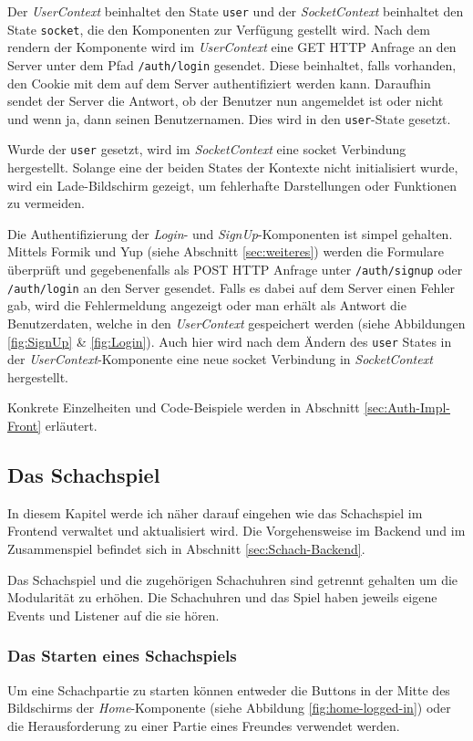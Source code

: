 Der \textit{UserContext} beinhaltet den State \verb|user| und der \textit{SocketContext} beinhaltet den State \verb|socket|, die den Komponenten zur Verfügung gestellt wird.
Nach dem rendern der Komponente wird im \textit{UserContext} eine GET HTTP Anfrage an den Server unter dem Pfad \verb|/auth/login| gesendet. Diese beinhaltet, falls vorhanden, den Cookie mit dem auf dem Server authentifiziert werden kann. Daraufhin sendet der Server die Antwort, ob der Benutzer nun angemeldet ist oder nicht und wenn ja, dann seinen Benutzernamen.
Dies wird in den \verb|user|-State gesetzt.

Wurde der \verb|user| gesetzt, wird im \textit{SocketContext} eine socket Verbindung hergestellt. Solange eine der beiden States der Kontexte nicht initialisiert wurde, wird ein Lade-Bildschirm gezeigt, um fehlerhafte Darstellungen oder Funktionen zu vermeiden.

Die Authentifizierung der \textit{Login}- und \textit{SignUp}-Komponenten ist simpel gehalten. Mittels Formik und Yup (siehe Abschnitt \ref{sec:weiteres}) werden die Formulare überprüft und gegebenenfalls als POST HTTP Anfrage unter \verb|/auth/signup| oder \verb|/auth/login| an den Server gesendet. Falls es dabei auf dem Server einen Fehler gab, wird die Fehlermeldung angezeigt oder man erhält als Antwort die Benutzerdaten, welche in den \textit{UserContext} gespeichert werden (siehe Abbildungen \ref{fig:SignUp} \& \ref{fig:Login}). Auch hier wird nach dem Ändern des \verb|user| States in der \textit{UserContext}-Komponente eine neue socket Verbindung in \textit{SocketContext} hergestellt.

Konkrete Einzelheiten und Code-Beispiele werden in Abschnitt \ref{sec:Auth-Impl-Front} erläutert.
        
        \subsection{Das Schachspiel}
        \label{sec:Schachspiel}
        In diesem Kapitel werde ich näher darauf eingehen wie das Schachspiel im Frontend verwaltet und aktualisiert wird. Die Vorgehensweise im Backend und im Zusammenspiel befindet sich in Abschnitt \ref{sec:Schach-Backend}.
        
Das Schachspiel und die zugehörigen Schachuhren sind getrennt gehalten um die Modularität zu erhöhen. Die Schachuhren und das Spiel haben jeweils eigene Events und Listener auf die sie hören.
		\subsubsection{Das Starten eines Schachspiels}
		\label{sec:Frontend-Schach-Start}
Um eine Schachpartie zu starten können entweder die Buttons in der Mitte des Bildschirms der \textit{Home}-Komponente (siehe Abbildung \ref{fig:home-logged-in}) oder die Herausforderung zu einer Partie eines Freundes verwendet werden.

